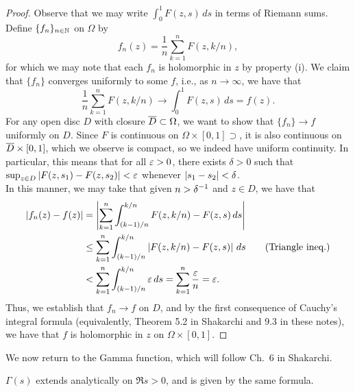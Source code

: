 \begin{proof}
    Observe that we may write $\int_0^1 F(z, s) \, ds$ in terms of Riemann sums. Define $\{f_n\}_{n \in \mathbb N}$ on $\Omega$ by
    \[ f_n(z) = \frac{1}{n} \sum_{k=1}^n F(z, k/n), \]
    for which we may note that each $f_n$ is holomorphic in $z$ by property (i). We claim that $\{f_n\}$ converges uniformly to some $f$, i.e., as $n \to \infty$, we have that
    \[ \frac{1}{n} \sum_{k=1}^n F(z, k/n) \to \int_0^1 F(z, s) \, ds = f(z). \]
    For any open disc $D$ with closure $\overline D \subset \Omega$, we want to show that $\{f_n\} \to f$ uniformly on $D$. Since $F$ is continuous on $\Omega \times [0, 1] \supset$, it is also continuous on $\overline D \times [0, 1]$, which we observe is compact, so we indeed have uniform continuity. In particular, this means that for all $\varepsilon > 0$, there exists $\delta > 0$ such that $\sup_{z \in D} \left\lvert F(z, s_1) - F(z, s_2) \right\rvert < \varepsilon$ whenever $\left\lvert s_1 - s_2 \right\rvert < \delta$.
    \\[8pt]
    In this manner, we may take that given $n > \delta^{-1}$ and $z \in D$, we have that
    \begin{align*}
        \left\lvert f_n(z) - f(z) \right\rvert &= \left\lvert \sum_{k=1}^n \int_{(k-1)/n}^{k/n} F(z, k/n) - F(z, s) \, ds \right\rvert \\
        &\leq \sum_{k=1}^n \int_{(k-1)/n}^{k/n} \left\lvert F(z, k/n) - F(z, s) \right\rvert \, ds \tag{Triangle ineq.} \\
        &< \sum_{k=1}^n \int_{(k-1)/n}^{k/n} \varepsilon \, ds = \sum_{k=1}^n \frac{\varepsilon}{n} = \varepsilon.
    \end{align*}
    Thus, we establish that $f_n \to f$ on $D$, and by the first consequence of Cauchy's integral formula (equivalently, Theorem 5.2 in Shakarchi and 9.3 in these notes), we have that $f$ is holomorphic in $z$ on $\Omega \times [0, 1]$.
\end{proof}
\noindent We now return to the Gamma function, which will follow Ch.\ 6 in Shakarchi.
\begin{proposition}
    $\Gamma(s)$ extends analytically on $\Re s > 0$, and is given by the same formula.
\end{proposition}
